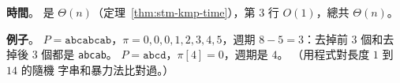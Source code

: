 \textbf{時間}。  是 $\Theta(n)$（定理~\ref{thm:stm-kmp-time}），第 3 行 $O(1)$，總共
$\Theta(n)$。

\textbf{例子}。 $P = \mathtt{abcabcab}$，$\pi = 0, 0, 0, 1, 2, 3, 4, 5$，週期 $8 - 5 = 3$：去掉前 $3$ 個和去掉後
$3$ 個都是 \texttt{abcab}。 $P = \mathtt{abcd}$，$\pi[4] = 0$，週期是 $4$。 （用程式對長度 $1$ 到 $14$ 的隨機
字串和暴力法比對過。）
